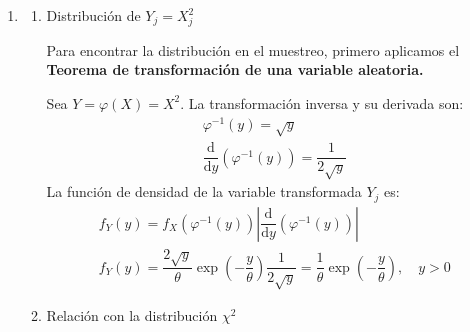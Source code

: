 \begin{enumerate}[label=\color{red}\textbf{\arabic*)}]
\begin{enumerate}[label=\arabic*)]
		            Por la linealidad de la esperanza:  \[
			            \mathbb{E}[S]=\mathbb{E}\left[ \sum_{j=1}^{n} X_j \right] =\sum_{j=1}^{n} \mathbb{E}[X_j]=n\mu
		            \]
		            Dado que las variables de una m.a.s. son independientes entre sí, la varianza de la suma es igual a la suma de las varianzas: \[
			            \mathrm{Var}(S)=\mathrm{Var}\left( \sum_{j=1}^{n} X_j \right) =\sum_{j=1}^{n} \mathrm{Var}(X_j)=n\sigma^2
		            \]
		      \item Distribución en el muestreo de $S$

		            Puesto que  $S$ es una transformación lineal de  $\bar{X}_n$ ($S=n\bar{X}_n$), y la media muestral sigue una distribución normal exacta según el Teorema de Fisher, la variable suma $S$ también se distribuye exactamente como una normal.

		            Sustituyendo los momentos calculados, concluimos que la distribución en el muestreo es:  $$S\sim \mathcal{N}(n\mu,n\sigma^2)$$
	      \end{enumerate}
	\item {}

	      \begin{enumerate}[label=\arabic*)]
		      \item Distribución de $Y_j=X_j^2$

		            Para encontrar la distribución en el muestreo, primero aplicamos el \textbf{Teorema de transformación de una variable aleatoria.}

		            Sea $Y=\varphi(X)=X^2$. La transformación inversa y su derivada son:
		            \[
			            \begin{array}{c}
				            \varphi^{-1}(y)=\sqrt{y} \\
				            \dfrac{\mathrm{d}}{\mathrm{d}y}(\varphi^{-1}(y))=\dfrac{1}{2\sqrt{y}}
			            \end{array}
		            \]
		            La función de densidad de la variable transformada $Y_j$ es:  \[
			            \begin{array}{c}
				            f_Y(y)=f_X(\varphi^{-1}(y))\left| \dfrac{\mathrm{d}}{\mathrm{d}y}(\varphi^{-1}(y)) \right| \\
				            f_Y(y)=\dfrac{2\sqrt{y} }{\theta}\exp\left( -\dfrac{y}{\theta} \right) \dfrac{1}{2\sqrt{y} }=\dfrac{1}{\theta}\exp\left( -\dfrac{y}{\theta} \right) ,\quad y>0
			            \end{array}
		            \]
		      \item Relación con la distribución $\chi^2$


\end{enumerate}
\end{enumerate}
